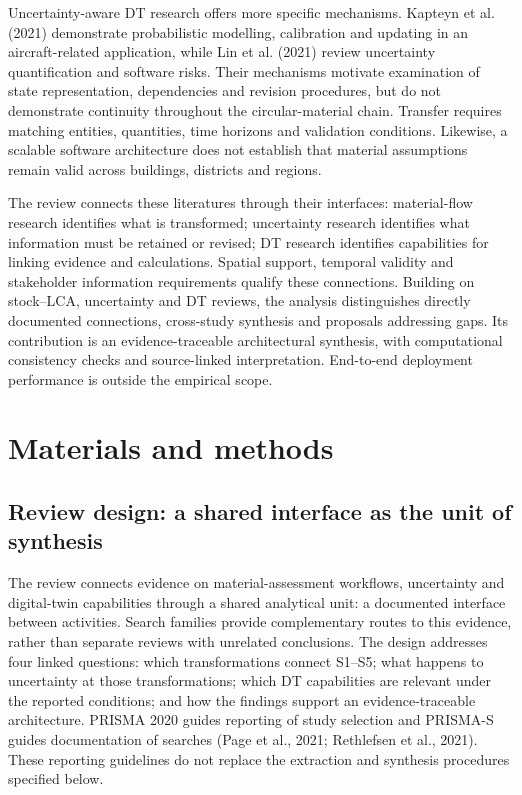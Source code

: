 Uncertainty-aware DT research offers more specific mechanisms. Kapteyn et al. (2021) demonstrate probabilistic modelling, calibration and updating in an aircraft-related application, while Lin et al. (2021) review uncertainty quantification and software risks. Their mechanisms motivate examination of state representation, dependencies and revision procedures, but do not demonstrate continuity throughout the circular-material chain. Transfer requires matching entities, quantities, time horizons and validation conditions. Likewise, a scalable software architecture does not establish that material assumptions remain valid across buildings, districts and regions.

The review connects these literatures through their interfaces: material-flow research identifies what is transformed; uncertainty research identifies what information must be retained or revised; DT research identifies capabilities for linking evidence and calculations. Spatial support, temporal validity and stakeholder information requirements qualify these connections. Building on stock–LCA, uncertainty and DT reviews, the analysis distinguishes directly documented connections, cross-study synthesis and proposals addressing gaps. Its contribution is an evidence-traceable architectural synthesis, with computational consistency checks and source-linked interpretation. End-to-end deployment performance is outside the empirical scope.


\section{Materials and methods}

\subsection{Review design: a shared interface as the unit of synthesis}
The review connects evidence on material-assessment workflows, uncertainty and digital-twin capabilities through a shared analytical unit: a documented interface between activities. Search families provide complementary routes to this evidence, rather than separate reviews with unrelated conclusions. The design addresses four linked questions: which transformations connect S1–S5; what happens to uncertainty at those transformations; which DT capabilities are relevant under the reported conditions; and how the findings support an evidence-traceable architecture. PRISMA 2020 guides reporting of study selection and PRISMA-S guides documentation of searches (Page et al., 2021; Rethlefsen et al., 2021). These reporting guidelines do not replace the extraction and synthesis procedures specified below.

